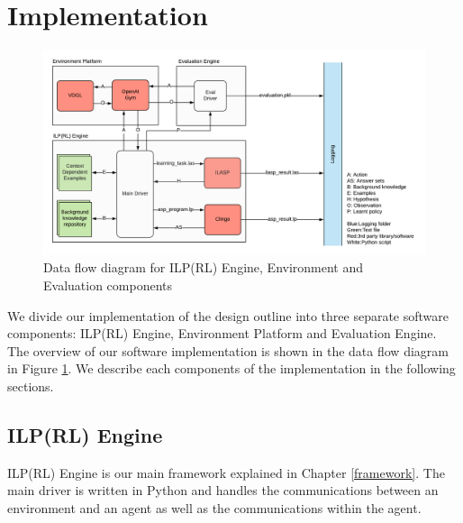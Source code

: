 
\section{Implementation}
\begin{figure}[!htb]
\centering
\includegraphics[width=1.0\textwidth]{./figures/ILPRL_dataflow}
\caption{Data flow diagram for ILP(RL) Engine, Environment and Evaluation components}
\label{fig:dataflow}
\end{figure}
We divide our implementation of the design outline into three separate software components: ILP(RL) Engine, Environment Platform and Evaluation Engine. The overview of our software implementation is shown in the data flow diagram in Figure \ref{fig:dataflow}. We describe each components of the implementation in the following sections.

\subsection{ILP(RL) Engine}
ILP(RL) Engine is our main framework explained in Chapter \ref{framework}. The main driver is written in Python and handles the communications between an environment and an agent as well as the communications within the agent. 

